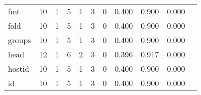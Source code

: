\begin{longtable}{lp{1.20cm}p{1.20cm}p{1.20cm}p{1.20cm}p{1.20cm}p{1.20cm}p{1.20cm}p{1.20cm}p{1.20cm}p{1.20cm}}
fmt       &                                    10 &                                                  1 &                                                  5 &                                                  1 &                                                  3 &                                                  0 &                                         0.400 &                                              0.900 &                                              0.000 \\
fold      &                                    10 &                                                  1 &                                                  5 &                                                  1 &                                                  3 &                                                  0 &                                         0.400 &                                              0.900 &                                              0.000 \\
groups    &                                    10 &                                                  1 &                                                  5 &                                                  1 &                                                  3 &                                                  0 &                                         0.400 &                                              0.900 &                                              0.000 \\
head      &                                    12 &                                                  1 &                                                  6 &                                                  2 &                                                  3 &                                                  0 &                                         0.396 &                                              0.917 &                                              0.000 \\
hostid    &                                    10 &                                                  1 &                                                  5 &                                                  1 &                                                  3 &                                                  0 &                                         0.400 &                                              0.900 &                                              0.000 \\
id        &                                    10 &                                                  1 &                                                  5 &                                                  1 &                                                  3 &                                                  0 &                                         0.400 &                                              0.900 &                                              0.000 \\

\end{longtable}
